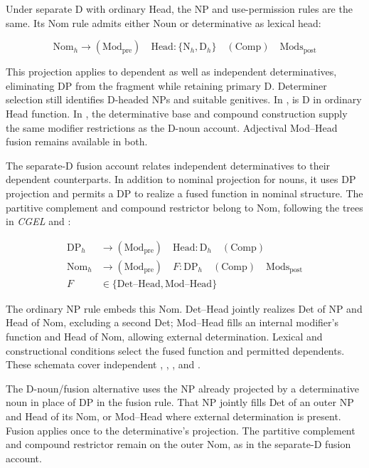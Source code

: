 \documentclass[12pt]{article}
\begin{document}
Under separate D with ordinary Head, the NP and use-permission rules are the same. Its Nom rule admits either Noun or determinative as lexical head:

\[
\mathrm{Nom}_{h}\to(\mathrm{Mod}_{\mathrm{pre}})\quad\mathrm{Head}:\{\mathrm{N}_{h},\mathrm{D}_{h}\}\quad(\mathrm{Comp})\quad\mathrm{Mods}_{\mathrm{post}}
\]

This projection applies to dependent as well as independent determinatives, eliminating DP from the fragment while retaining primary D. Determiner selection still identifies D-headed NPs and suitable genitives. In ,  is D in ordinary Head function. In , the determinative base and compound construction supply the same modifier restrictions as the D-noun account. Adjectival Mod--Head fusion remains available in both.

The separate-D fusion account relates independent determinatives to their dependent counterparts. In addition to nominal projection for nouns, it uses DP projection and permits a DP to realize a fused function in nominal structure. The partitive complement and compound restrictor belong to Nom, following the trees in \textit{CGEL} and \textcite[582]{Payne2007}:

\[
\begin{aligned}
\mathrm{DP}_{h} &\to (\mathrm{Mod}_{\mathrm{pre}})\quad \mathrm{Head}:\mathrm{D}_{h}\quad (\mathrm{Comp}) \\
\mathrm{Nom}_{h} &\to (\mathrm{Mod}_{\mathrm{pre}})\quad F:\mathrm{DP}_{h}\quad (\mathrm{Comp})\quad \mathrm{Mods}_{\mathrm{post}} \\
F&\in\{\mathrm{Det\text{--}Head},\mathrm{Mod\text{--}Head}\}
\end{aligned}
\]

The ordinary NP rule embeds this Nom. Det--Head jointly realizes Det of NP and Head of Nom, excluding a second Det; Mod--Head fills an internal modifier's function and Head of Nom, allowing external determination. Lexical and constructional conditions select the fused function and permitted dependents. These schemata cover independent , , , and .

The D-noun/fusion alternative uses the NP already projected by a determinative noun in place of DP in the fusion rule. That NP jointly fills Det of an outer NP and Head of its Nom, or Mod--Head where external determination is present. Fusion applies once to the determinative's projection. The partitive complement and compound restrictor remain on the outer Nom, as in the separate-D fusion account.
\end{document}
